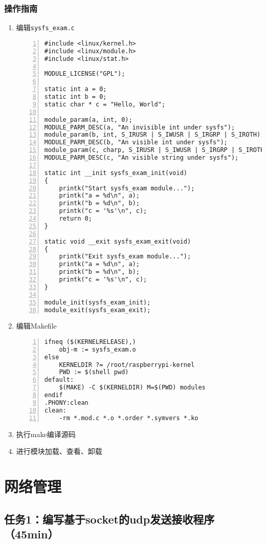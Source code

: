 \documentclass{article}
\begin{document}
\subsubsection{操作指南}
\begin{enumerate}

	\item 编辑\verb|sysfs_exam.c|
	      \begin{lstlisting}[numbers=left]
#include <linux/kernel.h>
#include <linux/module.h>
#include <linux/stat.h>
 
MODULE_LICENSE("GPL");

static int a = 0;
static int b = 0;
static char * c = "Hello, World";
 
module_param(a, int, 0);
MODULE_PARM_DESC(a, "An invisible int under sysfs");
module_param(b, int, S_IRUSR | S_IWUSR | S_IRGRP | S_IROTH);
MODULE_PARM_DESC(b, "An visible int under sysfs");
module_param(c, charp, S_IRUSR | S_IWUSR | S_IRGRP | S_IROTH);
MODULE_PARM_DESC(c, "An visible string under sysfs");
 
static int __init sysfs_exam_init(void)
{
	printk("Start sysfs_exam module...");
	printk("a = %d\n", a);
	printk("b = %d\n", b);
	printk("c = '%s'\n", c);
	return 0; 
}

static void __exit sysfs_exam_exit(void) 
{
	printk("Exit sysfs_exam module...");
	printk("a = %d\n", a);
	printk("b = %d\n", b);
	printk("c = '%s'\n", c); 
}
 
module_init(sysfs_exam_init);
module_exit(sysfs_exam_exit);

\end{lstlisting}
	\item 编辑Makefile
	      \begin{lstlisting}[numbers=left]
ifneq ($(KERNELRELEASE),)
	obj-m := sysfs_exam.o
else
	KERNELDIR ?= /root/raspberrypi-kernel
	PWD := $(shell pwd)
default:
	$(MAKE) -C $(KERNELDIR) M=$(PWD) modules
endif
.PHONY:clean
clean:
	-rm *.mod.c *.o *.order *.symvers *.ko

\end{lstlisting}
	\item 执行make编译源码
	\item 进行模块加载、查看、卸载
\end{enumerate}

\newpage


\section{网络管理}
\subsection{任务1：编写基于socket的udp发送接收程序（45min）}
\end{document}
